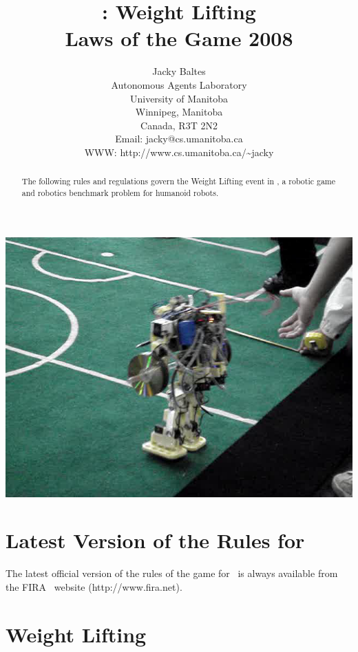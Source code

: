 \documentclass[12pt]{hurocup}
\begin{document}
\title{\HuroCup: Weight Lifting\\
  Laws of the Game 2008}


\author{Jacky Baltes\\
Autonomous Agents Laboratory\\
University of Manitoba\\
Winnipeg, Manitoba\\
Canada, R3T 2N2\\
Email: jacky@cs.umanitoba.ca\\
WWW: http://www.cs.umanitoba.ca/\~{ }jacky
}

\maketitle

\begin{center}
 \includegraphics[width=0.7\linewidth]{Figures/weight-lifting-life}
\end{center}

\begin{abstract}
The following rules and regulations govern the Weight Lifting event in
\HuroCup, a robotic game and robotics benchmark problem for humanoid
robots.
%
\end{abstract}

\section*{Latest Version of the Rules for \HuroCup}
\label{sec:updates}

The latest official version of the rules of the game for \HuroCup\ is
always available from the FIRA \HuroCup\ website (http://www.fira.net).

\newpage

\section{Weight Lifting}
\label{sec:weight-lifting} 
\end{document}

